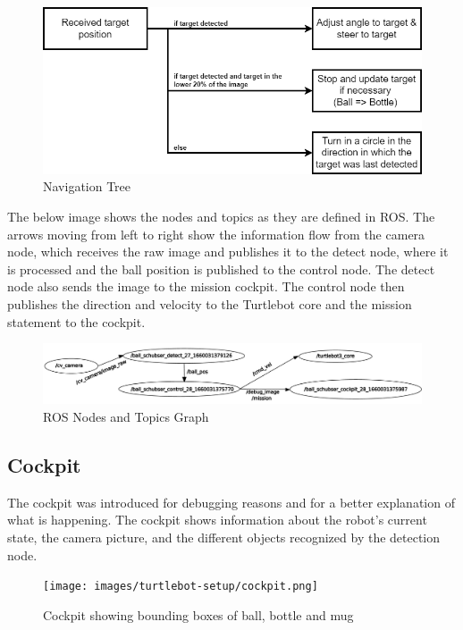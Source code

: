 \begin{figure}[!ht]
\centering
\includegraphics[width=\linewidth]{images/turtlebot-setup/navigation-tree.png}
\caption{Navigation Tree}
\label{fig:navigation-tree}
\end{figure}


The below image shows the nodes and topics as they are defined in ROS. The arrows moving from left to right show the information flow from the camera node, which receives the raw image and publishes it to the detect node, where it is processed and the ball position is published to the control node. The detect node also sends the image to the mission cockpit. The control node then publishes the direction and velocity to the Turtlebot core and the mission statement to the cockpit.

\begin{figure}[!ht]
\centering
\includegraphics[width=\linewidth]{images/turtlebot-setup/ros_graph.png}
\caption{ROS Nodes and Topics Graph}
\label{fig:ros-rqt-graph}
\end{figure}

\subsection{Cockpit}
The cockpit was introduced for debugging reasons and for a better explanation of what is happening. The cockpit shows information about the robot's current state, the camera picture, and the different objects recognized by the detection node.

\begin{figure}[!ht]
\centering
\texttt{[image: images/turtlebot-setup/cockpit.png]}
\caption{Cockpit showing bounding boxes of ball, bottle and mug}
\label{fig:cockpit}
\end{figure}

